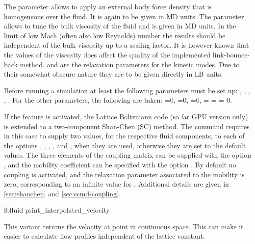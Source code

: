 The parameter  allows to apply an external body force
density that is homogeneous over the fluid. It is again to be given in
MD units.  The parameter  allows to tune the bulk
viscosity of the fluid and is given in MD units. In the limit of low
Mach (often also low Reynolds) number the results should be
independent of the bulk viscosity up to a scaling factor. 
It is however known that the values of the viscosity does 
affect the quality of the implemented link-bounce-back method.
 and
 are the relaxation parameters for the kinetic
modes. Due to their somewhat obscure nature they are to be given
directly in LB units.

Before running a simulation at least the following parameters must be
set up: , , , ,
. For the other parameters, the following are taken:
=0, =0, =0,
 =  =  = 0.

If the feature  is activated, the Lattice Boltzmann
code (so far GPU version only) is extended to a two-component
Shan-Chen (SC) method.  The  command requires in this case
to supply two values, for the respective fluid components, to each
of the options , , , ,
 and , when they are used, otherwise
they are set to the default values. The three elements of the
coupling matrix can be supplied with the option ,
and the mobility coefficient can be
specified with the option . By default no coupling is activated,
and the relaxation parameter associated to the mobility is zero, corresponding
to an infinite value for . Additional details are given in
\ref{sec:shanchen} and \ref{sec:scmd-coupling}.

\begin{essyntax}
  lbfluid print_interpolated_velocity   
\end{essyntax}
This variant returns the velocity at point in continuous space. 
This can make it easier to calculate flow profiles independent of
the lattice constant.

